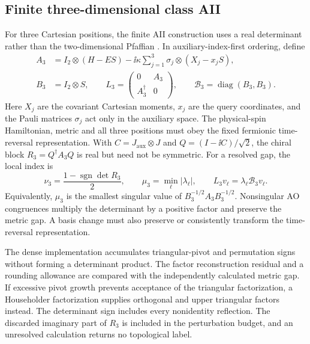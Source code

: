 \subsection{Finite three-dimensional class AII}
For three Cartesian positions, the finite AII construction uses
a real determinant rather than the two-dimensional Pfaffian
\cite{Loring2015}. In auxiliary-index-first ordering, define
\begin{equation}
 \begin{split}
 A_3&=I_2\otimes(H-ES)
       -\ii\kappa\sum_{j=1}^{3}\sigma_j\otimes(X_j-x_jS),\\
 B_3&=I_2\otimes S,\qquad
 L_3=\begin{pmatrix}0&A_3\\A_3^\dagger&0\end{pmatrix},\qquad
 \mathcal B_3=\operatorname{diag}(B_3,B_3).
 \end{split}
 \label{eq:finite-three-dimensional-localizer}
\end{equation}
Here $X_j$ are the covariant Cartesian moments, $x_j$ are the
query coordinates, and the Pauli matrices $\sigma_j$ act only
in the auxiliary space. The physical-spin Hamiltonian, metric
and all three positions must obey the fixed fermionic
time-reversal representation. With $C=J_{\mathrm{aux}}\otimes J$
and $Q=(I-\ii C)/\sqrt2$, the chiral block
$R_3=Q^\dagger A_3Q$ is real but need not be symmetric.
For a resolved gap, the local index is
\begin{equation}
 \nu_3=\frac{1-\operatorname{sgn}\det R_3}{2},\qquad
 \mu_3=\min_\ell|\lambda_\ell|,\qquad
 L_3v_\ell=\lambda_\ell\mathcal B_3v_\ell .
 \label{eq:finite-three-dimensional-index}
\end{equation}
Equivalently, $\mu_3$ is the smallest singular value of
$B_3^{-1/2}A_3B_3^{-1/2}$. Nonsingular AO congruences
multiply the determinant by a positive factor and preserve
the metric gap. A basis change must also preserve or
consistently transform the time-reversal representation.

The dense implementation accumulates triangular-pivot and
permutation signs without forming a determinant product.
The factor reconstruction residual and a rounding allowance
are compared with the independently calculated metric gap.
If excessive pivot growth prevents acceptance of the triangular
factorization, a Householder factorization supplies orthogonal
and upper triangular factors instead. The determinant sign
includes every nonidentity reflection. The discarded imaginary
part of $R_3$ is included in the perturbation budget, and an
unresolved calculation returns no topological label.

